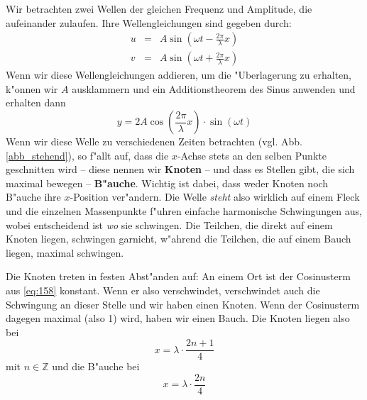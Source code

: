 Wir betrachten zwei Wellen der gleichen Frequenz und Amplitude, die
aufeinander zulaufen. Ihre Wellengleichungen sind gegeben durch:
\begin{eqnarray*}
   u &=& A \sin \left (\omega t - \frac{2\pi}{\lambda}x \right )\\
   v &=& A \sin \left (\omega t + \frac{2\pi}{\lambda} x\right )
\end{eqnarray*}
Wenn wir diese Wellengleichungen addieren, um die "Uberlagerung zu
erhalten, k"onnen wir $A$ ausklammern und ein Additionstheorem des
Sinus anwenden und erhalten dann
\begin{equation}
   \label{eq:158}
   y = 2A \cos\left ( \frac{2\pi}{\lambda}x \right ) \cdot \sin \left
      ( \omega t \right )
\end{equation}
Wenn wir diese Welle zu verschiedenen Zeiten betrachten
(vgl. Abb. \ref{abb_stehend}), so f"allt auf, dass die $x$-Achse stets
an den selben Punkte geschnitten wird -- diese nennen wir
\textbf{Knoten} -- und dass es Stellen gibt, die sich maximal bewegen
-- \textbf{B"auche}. Wichtig ist dabei, dass weder Knoten noch B"auche
ihre $x$-Position ver"andern. Die Welle \emph{steht} also wirklich auf
einem Fleck und die einzelnen Massenpunkte f"uhren einfache harmonische
Schwingungen aus, wobei entscheidend ist \emph{wo} sie schwingen. Die
Teilchen, die direkt auf einem Knoten liegen, schwingen garnicht,
w"ahrend die Teilchen, die auf einem Bauch liegen, maximal schwingen.

Die Knoten treten in festen Abst"anden auf: An einem Ort ist der
Cosinusterm aus \eqref{eq:158} konstant. Wenn er also verschwindet,
verschwindet auch die Schwingung an dieser Stelle und wir haben einen
Knoten. Wenn der Cosinusterm dagegen maximal (also 1) wird, haben wir
einen Bauch. Die Knoten liegen also bei
\begin{equation}
   \label{eq:159}
x = \lambda \cdot \frac{2n+1}{4}
\end{equation}
mit $n \in \mathbb Z$ und die B"auche bei
\begin{equation}
   \label{eq:160}
   x = \lambda \cdot \frac{2n}{4}
\end{equation}

